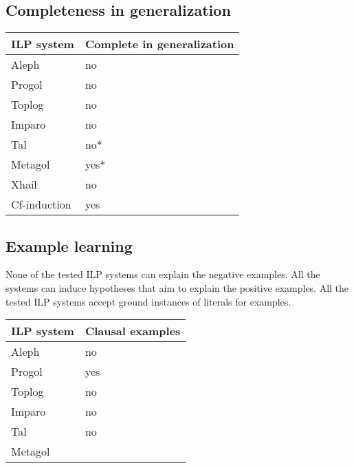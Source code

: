 \subsection{Completeness in generalization\cite{yamamoto2012inverse}}
\begin{center}
    \begin{tabular}{ | l | p{5cm} |}
    \hline
    ILP system &  Complete in generalization \\ \hline
    Aleph & no\\ \hline
    Progol & no\\ \hline
    Toplog & no\\ \hline
    Imparo & no\\ \hline
    Tal & no*\\ \hline
    Metagol & yes*\\ \hline
    Xhail & no\\ \hline
    Cf-induction & yes\\
    \hline
    \end{tabular}
\end{center}


\subsection{Example learning}
None of the tested ILP systems can explain the negative examples. All the systems can induce hypotheses that aim to explain the positive examples. All the tested ILP systems accept ground instances of literals for examples.
\begin{center}
    \begin{tabular}{ | l | p{5cm} |}
    \hline
    ILP system &  Clausal examples \\ \hline
    Aleph & no\\ \hline
    Progol & yes\\ \hline
    Toplog & no\\ \hline
    Imparo & no\\ \hline
    Tal & no\\ \hline
    Metagol & \\ \hline
    \hline
    \end{tabular}
\end{center}

